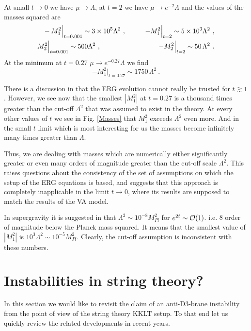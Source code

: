 \documentclass[11pt]{article}
\newcommand{\be}{\begin{equation}}
\newcommand{\ee}{\end{equation}}
\newcommand{\bea}{\begin{eqnarray}}
\newcommand{\eea}{\end{eqnarray}}
\def\be{\begin{equation}}
\def\ee{\end{equation}}
\def\bea{\begin{eqnarray}}
\def\eea{\end{eqnarray}}
\begin{document}
At small $t \to 0$ we have $\mu \to \Lambda$, at $t =2$ we have $\mu \to e^{-2}\Lambda$ and the values of the masses squared are
\bea
&\quad \! -M_1^2 \Big |_{t=0.001} \sim 3\times 10^{5} \Lambda ^2\ , \qquad &-M_1^2 \Big |_{t=2} \sim 5 \times 10^{3} \Lambda ^2\ ,\cr
& M_2^2 \Big |_{t=0.001} \sim 500 \Lambda ^2\ , \qquad &-M_2^2 \Big |_{t=2} \sim 50 \, \Lambda ^2\ .
\eea
At the minimum at $t=0.27$ $\mu \to e^{-0.27}\Lambda$ we find
\be
-M_1^2 \Big |_{t=0.27} \sim 1750 \, \Lambda ^2 \ .
\ee


There is a discussion in \cite{DallAgata:2022abm} that the ERG evolution cannot really be trusted for $t \gtrsim 1$. However, we see now that the smallest $|M_1^2|$ at $t=0.27$ is a thousand times greater than the cut-off  $\Lambda ^2$ that was assumed to exist in the theory. At every other values of $t$ we see in Fig. \ref{Masses} that $M_1^2$ exceeds $\Lambda ^2$ even more. And in the small $t$ limit which is most interesting for us the masses become infinitely many times greater than $\Lambda $.

Thus, we are dealing with masses which are numerically either significantly greater or even many orders of magnitude greater than the cut-off scale $\Lambda^2$. This raises questions about the consistency of the set of assumptions on which the setup of the ERG equations is based, and suggests that this approach is completely inapplicable in the limit $t\to 0$, where its results are supposed to match the results of the VA model.

In supergravity it is suggested in \cite{DallAgata:2022abm} that $\Lambda ^2 \sim 10^{-8} M_{Pl}^2$ for $e^{2t} \sim {\cal O} (1)$. i.e. 8 order of magnitude below the Planck mass squared. It means that the smallest value of $|M_1^2|$ is $10^3 \Lambda^2 \sim 10^{-5} M_{Pl}^2$. Clearly, the cut-off assumption is inconsistent with these numbers.



\section{Instabilities in string theory?}\label{sec:string}
In this section we would like to revisit the claim of an anti-D3-brane instability \cite{DallAgata:2022abm} from the point of view of the string theory KKLT setup. To that end let us quickly review the related developments in recent years.
\end{document}
